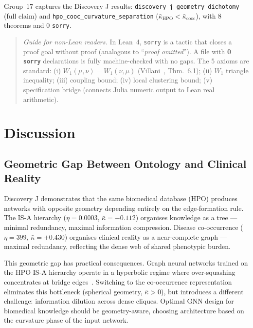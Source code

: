 \documentclass[11pt,a4paper]{article}
\newcommand{\kbar}{\bar{\kappa}}
\begin{document}
Group~17 captures the Discovery J results: \texttt{discovery\_j\_geometry\_dichotomy} (full claim) and \texttt{hpo\_cooc\_curvature\_separation} ($\kbar_{\text{HPO}} < \kbar_{\text{cooc}}$), with 8 theorems and 0 \texttt{sorry}.

\begin{quote}
\small\textit{Guide for non-Lean readers.} In Lean~4, \texttt{sorry} is a tactic that closes a proof goal without proof (analogous to ``\textit{proof omitted}''). A file with \textbf{0 \texttt{sorry}} declarations is fully machine-checked with no gaps. The 5 axioms are standard: (i) $W_1(\mu,\nu)=W_1(\nu,\mu)$ (Villani~\cite{villani2009optimal}, Thm.\ 6.1); (ii) $W_1$ triangle inequality; (iii) coupling bound; (iv) local clustering bound; (v) specification bridge (connects Julia numeric output to Lean real arithmetic).
\end{quote}

\section{Discussion}
\label{sec:discussion}

\subsection{Geometric Gap Between Ontology and Clinical Reality}

Discovery J demonstrates that the same biomedical database (HPO) produces networks with opposite geometry depending entirely on the edge-formation rule. The IS-A hierarchy ($\eta = 0.0003$, $\kbar = -0.112$) organises knowledge as a tree --- minimal redundancy, maximal information compression. Disease co-occurrence ($\eta = 399$, $\kbar = +0.430$) organises clinical reality as a near-complete graph --- maximal redundancy, reflecting the dense web of shared phenotypic burden.

This geometric gap has practical consequences. Graph neural networks trained on the HPO IS-A hierarchy operate in a hyperbolic regime where over-squashing concentrates at bridge edges~\cite{topping2022over}. Switching to the co-occurrence representation eliminates this bottleneck (spherical geometry, $\kbar > 0$), but introduces a different challenge: information dilution across dense cliques. Optimal GNN design for biomedical knowledge should be geometry-aware, choosing architecture based on the curvature phase of the input network.
\end{document}
